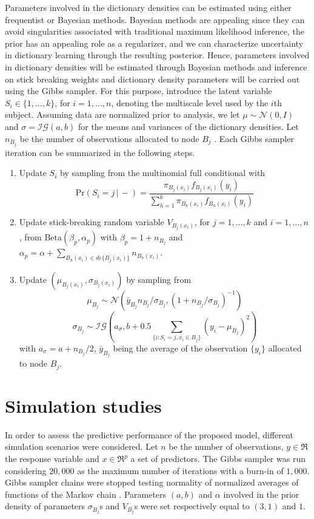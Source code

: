 \documentclass{article} %
\providecommand{\mc}[1]{\mathcal{#1}}
\begin{document}
Parameters involved in the dictionary densities can be estimated using either frequentist or Bayesian methods. Bayesian methods are appealing since they can avoid singularities associated with traditional maximum likelihood inference, the prior has an appealing role as a regularizer, and we can characterize uncertainty in dictionary learning through the resulting posterior.
Hence, parameters involved in dictionary densities will be estimated through Bayesian methods and inference on stick breaking weights and dictionary density parameters will be carried out using the Gibbs sampler. For this purpose, introduce the latent variable $S_i \in \{1,\ldots,k\}$, for $i=1,\ldots,n$, denoting the multiscale level used by the $i$th subject.  Assuming data are normalized prior to analysis, we let $\mu \sim \mc{N}(0,I)$ and $\sigma=\mc{IG}(a,b)$ for the means and variances of the dictionary densities. Let $n_{B_j}$ be  the number of observations allocated to node $B_j$ . Each Gibbs sampler iteration can be summarized in the following steps.
\begin{enumerate}
\item Update $S_i$ by sampling from the multinomial full conditional with 
\[\mbox{Pr}( S_i = j\, |\, -) = \frac{ \pi_{B_j(x_i)}f_{B_j(x_i)}(y_i) }{ \sum_{h=1}^k \pi_{B_h(x_i)}f_{B_h(x_i)}(y_i) } \label{eq:prS}\]
\item Update stick-breaking random variable $V_{B_j(x_i)}$, for $j=1, \ldots, k$ and $i=1, \ldots, n$, from $\mbox{Beta}(\beta_p,\alpha_p)$ with $\beta_p=1+n_{B_j}$ and $\alpha_p=\alpha+\sum_{B_h(x_i) \in de\{B_j(x_i)\}} n_{B_h(x_i)}$.
\item Update $(\mu_{B_j(x_i)},\sigma_{B_j(x_i)})$ by sampling from
\[  \mu_{B_j} \sim \mc{N}\left(\bar{y}_{B_j} n_{B_j}/\sigma_{B_j},(1+n_{B_j}/\sigma_{B_j})^{-1}\right)\]
\[ \sigma_{B_j} \sim \mc{IG}\left(a_{\sigma},b+0.5\sum_{\{i: S_i=j,x_i \in B_j\}} \left(y_{i}-\mu_{B_j}\right)^2\right)\]
with $a_{\sigma}=a+n_{B_j}/2$, $\bar{y}_{B_j}$ being the average of the observation $\{y_i\}$ allocated to node $B_j$.

\end{enumerate}


\section{Simulation studies}\label{section:simulation}

In order to assess the predictive performance of the proposed model, different simulation scenarios were considered. Let $n$ be the number of observations, $y \in \Re$ the response variable and $x \in \Re^p$ a set of predictors. The Gibbs sampler was run considering $20,000$ as the maximum number of iterations with a burn-in of $1,000$. Gibbs sampler chains were stopped testing normality of normalized averages of functions of the Markov chain \cite{Chauveau98anautomated}. Parameters $(a,b)$ and $\alpha$ involved in the prior density of parameters $\sigma_{B_j}$s and $V_{B_j}$s were set respectively equal to $(3,1)$ and $1$.
\end{document}
